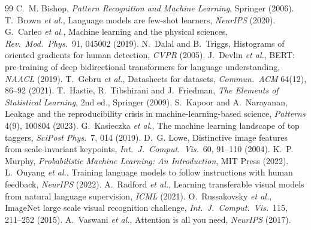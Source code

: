\documentclass[11pt]{article}
\begin{document}
\begin{thebibliography}{99}\small
{} C.~M. Bishop, \emph{Pattern Recognition and Machine Learning}, Springer (2006).
 T.~Brown \emph{et al.}, Language models are few-shot learners, \emph{NeurIPS} (2020).
 G.~Carleo \emph{et al.}, Machine learning and the physical sciences, \emph{Rev.\ Mod.\ Phys.}\ 91, 045002 (2019).
 N.~Dalal and B.~Triggs, Histograms of oriented gradients for human detection, \emph{CVPR} (2005).
 J.~Devlin \emph{et al.}, BERT: pre-training of deep bidirectional transformers for language understanding, \emph{NAACL} (2019).
 T.~Gebru \emph{et al.}, Datasheets for datasets, \emph{Commun.\ ACM} 64(12), 86--92 (2021).
 T.~Hastie, R.~Tibshirani and J.~Friedman, \emph{The Elements of Statistical Learning}, 2nd ed., Springer (2009).
 S.~Kapoor and A.~Narayanan, Leakage and the reproducibility crisis in machine-learning-based science, \emph{Patterns} 4(9), 100804 (2023).
 G.~Kasieczka \emph{et al.}, The machine learning landscape of top taggers, \emph{SciPost Phys.}\ 7, 014 (2019).
 D.~G. Lowe, Distinctive image features from scale-invariant keypoints, \emph{Int.\ J.\ Comput.\ Vis.}\ 60, 91--110 (2004).
 K.~P. Murphy, \emph{Probabilistic Machine Learning: An Introduction}, MIT Press (2022).
 L.~Ouyang \emph{et al.}, Training language models to follow instructions with human feedback, \emph{NeurIPS} (2022).
 A.~Radford \emph{et al.}, Learning transferable visual models from natural language supervision, \emph{ICML} (2021).
 O.~Russakovsky \emph{et al.}, ImageNet large scale visual recognition challenge, \emph{Int.\ J.\ Comput.\ Vis.}\ 115, 211--252 (2015).
 A.~Vaswani \emph{et al.}, Attention is all you need, \emph{NeurIPS} (2017).
\end{thebibliography}

\SourceNote
\end{document}
